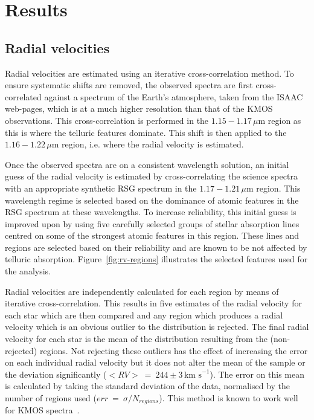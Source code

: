 \documentclass[useAMS,usenatbib]{mn2e}
\def\kms{$\mbox{km s}^{-1}$}
\begin{document}

\section{Results} %
\label{sec:results}


\subsection{Radial velocities} %
\label{sub:radial_velocities}
Radial velocities are estimated using an iterative cross-correlation method.
To ensure systematic shifts are removed, the observed spectra are first cross-correlated against a spectrum of the Earth's atmosphere, taken from the ISAAC web-pages, which is at a much higher resolution than that of the KMOS observations.
This cross-correlation is performed in the $1.15-1.17\,\mu$m region as this is where the telluric features dominate.
This shift is then applied to the $1.16-1.22\,\mu$m region, i.e. where the radial velocity is estimated.

Once the observed spectra are on a consistent wavelength solution, an initial guess of the radial velocity is estimated by cross-correlating the science spectra with an appropriate synthetic RSG spectrum in the $1.17-1.21\,\mu$m region.
This wavelength regime is selected based on the dominance of atomic features in the RSG spectrum at these wavelengths.
To increase reliability, this initial guess is improved upon by using five carefully selected groups of stellar absorption lines centred on some of the strongest atomic features in this region.
These lines and regions are selected based on their reliability and are known to be not affected by telluric absorption.
Figure~\ref{fig:rv-regions} illustrates the selected features used for the analysis.

Radial velocities are independently calculated for each region by means of iterative cross-correlation.
This results in five estimates of the radial velocity for each star which are then compared and any region which produces a radial velocity which is an obvious outlier to the distribution is rejected.
The final radial velocity for each star is the mean of the distribution resulting from the (non-rejected) regions.
Not rejecting these outliers has the effect of increasing the error on each individual radial velocity but it does not alter the mean of the sample or the deviation significantly ($<RV>~=~244\pm3\,$\kms).
The error on this mean is calculated by taking the standard deviation of the data, normalised by the number of regions used ($err~=~\sigma/N_{regions}$).
This method is known to work well for KMOS spectra~\citep{2015ApJ...798...23L,2015ApJ...803...14P}.
\end{document}
